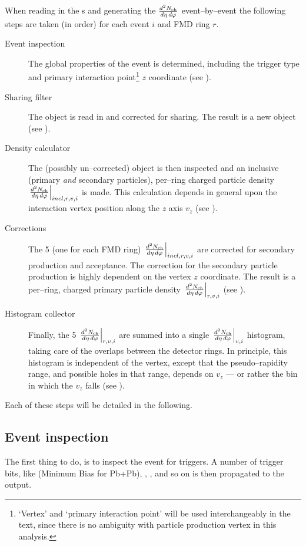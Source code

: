 \documentclass[11pt]{article}
\begin{document}
When reading in the \ESD{}s and generating the $\dndetadphi$
event--by--event the following steps are taken (in order) for each
event $i$ and FMD ring $r$.
\begin{description}
\item[Event inspection] The global properties of the event is
  determined, including the trigger type and primary interaction
  point\footnote{`Vertex' and `primary interaction point' will be used
    interchangeably in the text, since there is no ambiguity with
    particle production vertex in this analysis.} $z$ coordinate (see
  ).
\item[Sharing filter] The \ESD{} object is read in and corrected for
  sharing.  The result is a new \ESD{} object (see
  ).
\item[Density calculator] The (possibly un--corrected) \ESD{} object
  is then inspected and an inclusive (primary \emph{and} secondary
  particles), per--ring charged particle density
  $\dndetadphi[incl,r,v,i]$ is made.  This calculation depends in
  general upon the interaction vertex position along the $z$ axis
  $v_z$ (see ).
\item[Corrections] The 5 (one for each FMD ring)
  $\dndetadphi[incl,r,v,i]$ are corrected for secondary production and
  acceptance.  The correction for the secondary particle production is
  highly dependent on the vertex $z$ coordinate.  The result is a
  per--ring, charged primary particle density $\dndetadphi[r,v,i]$
  (see ).
\item[Histogram collector] Finally, the 5 $\dndetadphi[r,v,i]$ are
  summed into a single $\dndetadphi[v,i]$ histogram, taking care of
  the overlaps between the detector rings.  In principle, this
  histogram is independent of the vertex, except that the
  pseudo--rapidity range, and possible holes in that range, depends on
  $v_z$ --- or rather the bin in which the $v_z$ falls (see
  ).
\end{description}

Each of these steps will be detailed in the following. 

\subsection{Event inspection}
\label{sec:sub:event_inspection}

The first thing to do, is to inspect the event for triggers.  A number
of trigger bits, like \INEL{} (Minimum Bias for Pb+Pb), \INELONE{},
\NSD{}, and so on is then propagated to the \AOD{} output.
\end{document}
